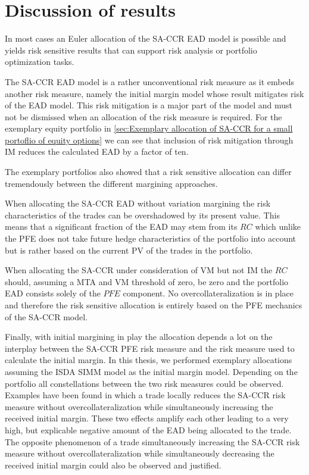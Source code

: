 \documentclass[../Thesis_AHoecherl.tex]{subfiles}
\begin{document}
    \chapter{Discussion of results}\label{Discussion of results}

    In most cases an Euler allocation of the SA-CCR EAD model is possible and yields risk sensitive results that can support risk analysis or portfolio optimization tasks.

    The SA-CCR EAD model is a rather unconventional risk measure as it embeds another risk measure, namely the initial margin model whose result mitigates risk of the EAD model.
    This risk mitigation is a major part of the model and must not be dismissed when an allocation of the risk measure is required. For the exemplary equity portfolio in \ref{sec:Exemplary allocation of SA-CCR for a small portoflio of equity options} we can see that inclusion of risk mitigation through IM reduces the calculated EAD by a factor of ten.

    The exemplary portfolios also showed that a risk sensitive allocation can differ tremendously between the different margining approaches. 
    
    When allocating the SA-CCR EAD without variation margining the risk characteristics of the trades can be overshadowed by its present value. This means that a significant fraction of the EAD may stem from its $RC$ which unlike the PFE does not take future hedge characteristics of the portfolio into account but is rather based on the current PV of the trades in the portfolio.

    When allocating the SA-CCR under consideration of VM but not IM the $RC$ should, assuming a MTA and VM threshold of zero, be zero and the portfolio EAD consists solely of the $PFE$ component. No overcollateralization is in place and therefore the risk sensitive allocation is entirely based on the PFE mechanics of the SA-CCR model.

    Finally, with initial margining in play the allocation depends a lot on the interplay between the SA-CCR PFE risk measure and the risk measure used to calculate the initial margin. In this thesis, we performed exemplary allocations assuming the ISDA SIMM model as the initial margin model. 
    Depending on the portfolio all constellations between the two risk measures could be observed. Examples have been found in which a trade locally reduces the SA-CCR risk measure without overcollateralization while simultaneously increasing the received initial margin. These two effects amplify each other leading to a very high, but explicable negative amount of the EAD being allocated to the trade. The opposite phenomenon of a trade simultaneously increasing the SA-CCR risk measure without overcollateralization while simultaneously decreasing the received initial margin could also be observed and justified.
\end{document}
